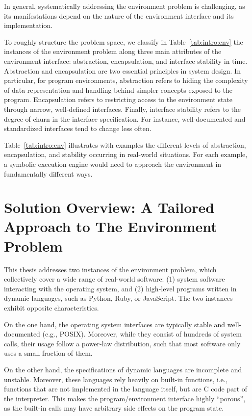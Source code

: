 In general, systematically addressing the environment problem is challenging, as its manifestations depend on the nature of the environment interface and its implementation.

To roughly structure the problem space, we classify in Table~\ref{tab:intro:env} the instances of the environment problem along three main attributes of the environment interface: abstraction, encapsulation, and interface stability in time.
%
Abstraction and encapsulation are two essential principles in system design.  In particular, for program environments, abstraction refers to hiding the complexity of data representation and handling behind simpler concepts exposed to the program.  Encapsulation refers to restricting access to the environment state through narrow, well-defined interfaces.
%
Finally, interface stability refers to the degree of churn in the interface specification.  For instance, well-documented and standardized interfaces tend to change less often.

Table~\ref{tab:intro:env} illustrates with examples the different levels of abstraction, encapsulation, and stability occurring in real-world situations.  For each example, a symbolic execution engine would need to approach the environment in fundamentally different ways.


\section{Solution Overview: A Tailored Approach to The Environment Problem}

This thesis addresses two instances of the environment problem, which collectively cover a wide range of real-world software: (1) system software interacting with the operating system, and (2) high-level programs written in dynamic languages, such as Python, Ruby, or JavaScript.
%
The two instances exhibit opposite characteristics.

On the one hand, the operating system interfaces are typically stable and well-documented (e.g., POSIX).  Moreover, while they consist of hundreds of system calls, their usage follow a power-law distribution, such that most software only uses a small fraction of them.

On the other hand, the specifications of dynamic languages are incomplete and unstable.
%
Moreover, these languages rely heavily on built-in functions, i.e., functions that are not implemented in the language itself, but are C code part of the interpreter.  This makes the program/environment interface highly ``porous'', as the built-in calls may have arbitrary side effects on the program state.

